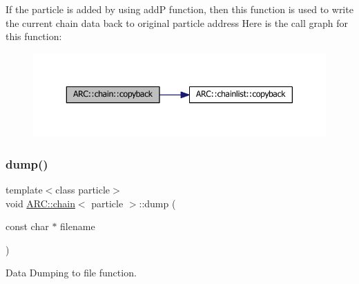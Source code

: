If the particle is added by using addP function, then this function is used to write the current chain data back to original particle address Here is the call graph for this function\+:
\nopagebreak
\begin{figure}[H]
\begin{center}
\leavevmode
\includegraphics[width=350pt]{classARC_1_1chain_a780fe41b768a5f8821ea799dae8b3d10_cgraph}
\end{center}
\end{figure}
\hypertarget{classARC_1_1chain_adefda13efa8a0a22e4597600ea1bc193}{}\label{classARC_1_1chain_adefda13efa8a0a22e4597600ea1bc193} 
\subsubsection{\texorpdfstring{dump()}{dump()}}
{\footnotesize\ttfamily template$<$class particle$>$ \\
void \hyperlink{classARC_1_1chain}{A\+R\+C\+::chain}$<$ particle $>$\+::dump (\begin{DoxyParamCaption}\item[{const char $\ast$}]{filename }\end{DoxyParamCaption})\hspace{0.3cm}{\ttfamily [inline]}}



Data Dumping to file function. 


